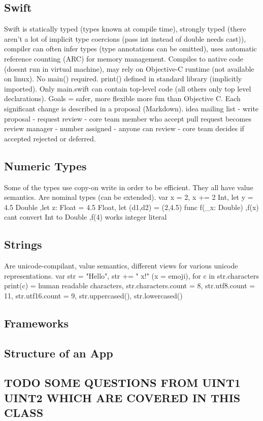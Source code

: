 \subsection{Swift}
Swift is statically typed (types known at compile time), strongly typed (there aren't a lot of implicit type coercions (pass int instead of double needs cast)), compiler can often infer types (type annotations can be omitted), uses automatic reference counting (ARC) for memory management. Compiles to native code (doesnt run in virtual machine), may rely on Objective-C runtime (not available on linux). No main() required. print() defined in standard library (implicitly imported). Only main.swift can contain top-level code (all others only top level declarations). Goals = safer, more flexible more fun than Objective C. Each significant change is described in a proposal (Markdown). idea mailing list - write proposal - request review - core team member who accept pull request becomes review manager - number assigned - anyone can review - core team decides if accepted rejected or deferred.

\subsection{Numeric Types}
Some of the types use copy-on write in order to be efficient. They all have value semantics. Are nominal types (can be extended).
var x = 2, x += 2 Int,
let y = 4.5 Double
,let z: Float = 4.5 Float,
let (d1,d2) = (2,4.5)
func f(\_x: Double) {}
,f(x) cant convert Int to Double
,f(4) works integer literal

\subsection{Strings}
Are unicode-compilant, value semantics, different views for various unicode representations.
var str = "Hello", str += " x!" (x = emoji),
for c in str.characters {print(c)} = human readable characters,
str.characters.count = 8,
str.utf8.count = 11,
str.utf16.count = 9,
str.uppercased(),
str.lowercased()

\subsection{Frameworks}

\subsection{Structure of an App}

\subsection{TODO SOME QUESTIONS FROM UINT1 UINT2 WHICH ARE COVERED IN THIS CLASS}